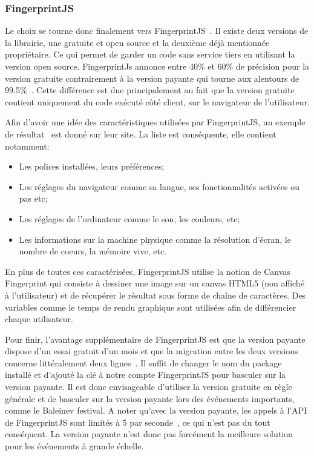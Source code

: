 \subsubsection{FingerprintJS}
Le choix se tourne donc finalement vers FingerprintJS~\cite{fingerprintjs}. Il existe deux versions de la librairie, une gratuite et open source et la deuxième déjà mentionnée propriétaire. Ce qui permet de garder un code sans service tiers en utilisant la version open source. FingerprintJs annonce entre 40\% et 60\% de précision pour la version gratuite contrairement à la version payante qui tourne aux alentours de 99.5\%~\cite{fingerprintjsrepo}. Cette différence est due principalement au fait que la version gratuite contient uniquement du code exécuté côté client, sur le navigateur de l'utilisateur.

Afin d'avoir une idée des caractéristiques utilisées par FingerprintJS, un exemple de résultat~\cite{fingerprintjs-example} est donné sur leur site. La liste est conséquente, elle contient notamment:

\begin{itemize}
  \item Les polices installées, leurs préférences;
  \item Les réglages du navigateur comme sa langue, ses fonctionnalités activées ou pas etc;
  \item Les réglages de l'ordinateur comme le son, les couleurs, etc;
  \item Les informations sur la machine physique comme la résolution d'écran, le nombre de coeurs, la mémoire vive, etc.
\end{itemize}

En plus de toutes ces caractérisées, FingerprintJS utilise la notion de Canvas Fingerprint qui consiste à dessiner une image sur un canvas HTML5 (non affiché à l'utilisateur) et de récupérer le résultat sous forme de chaîne de caractères. Des variables comme le temps de rendu graphique sont utilisées afin de différencier chaque utilisateur.

Pour finir, l'avantage supplémentaire de FingerprintJS est que la version payante dispose d'un essai gratuit d'un mois et que la migration entre les deux versions concerne littéralement deux lignes~\cite{migratefingerprintjs}. Il suffit de changer le nom du package installé et d'ajouté la clé à notre compte FingerprintJS pour basculer sur la version payante. Il est donc envisageable d'utiliser la version gratuite en règle générale et de basculer sur la version payante lors des événements importants, comme le Baleinev festival. A noter qu'avec la version payante, les appels à l'API de FingerprintJS sont limités à 5 par seconde~\cite{fingerprintjs-limits}, ce qui n'est pas du tout conséquent. La version payante n'est donc pas forcément la meilleure solution pour les événements à grande échelle.

